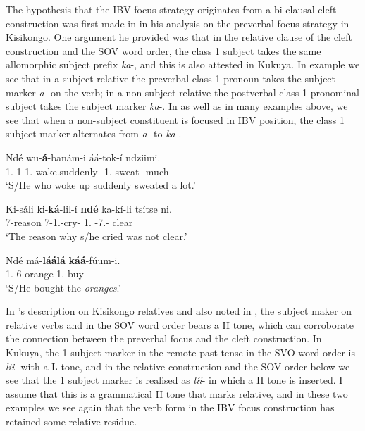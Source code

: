 \documentclass[output=paper,colorlinks,citecolor=brown,
]{langscibook}
\begin{document}
The hypothesis that the IBV focus strategy originates from a bi-clausal cleft construction was first made in \citet{DeKind2014} in his analysis on the preverbal focus strategy in Kisikongo. One argument he  provided was that in the relative clause of the cleft construction and the SOV word order, the class 1 subject takes the same allomorphic subject prefix \textit{ka}-, and this is also attested in Kukuya. In example  we see that in a subject relative the preverbal class 1 pronoun takes the subject marker \textit{a}- on the verb; in a non-subject relative the postverbal class 1 pronominal subject takes the subject marker \textit{ka}-. In  as well as in many examples above, we see that when a non-subject constituent is focused in IBV position, the class 1 subject marker alternates from \textit{a}- to \textit{ka}-.
\begin{exe}
    \ex \label{145}
    \begin{xlist}
\ex
\label{145a}
\gll
Ndé wu-\textbf{á}-banám-i áá-tok-í ndziimi.\\
1.\Pro{} 1\Rel{}-1\Sm{}.\Pst{}-wake.suddenly-\Pst{} 1\Sm{}.\Pst{}-sweat-\Pst{} much\\
\trans ‘S/He who woke up suddenly sweated a lot.’ \\

\ex
\label{145b}
\gll
Ki-sáli ki-\textbf{ká}-lil-í \textbf{ndé} ka-kí-li tsítse ni.\\
7-reason 7\Rel{}-1\Sm{}.\Pst{}-cry-\Pst{} 1.\Pro{} \Neg{}-7\Sm{}.\Pst{}-\Cop{} clear \Neg{}\\
\trans ‘The reason why s/he cried was not clear.’ 

    \end{xlist}
\end{exe}
\begin{exe}
\ex
\label{146}
\gll
Ndé má-\textbf{láálá} \textbf{káá}-fúum-i.\\
1.\Pro{} 6-orange 1\Sm{}.\Pst{}-buy-\Pst{}\\
\trans ‘S/He bought the \textit{oranges}.’

\end{exe}
In \citet{NdongaMfuwa1995}'s description on Kisikongo relatives and also noted in \citet{DeKind2014}, the subject maker on relative verbs and in the SOV word order bears a H tone, which can corroborate the connection between the preverbal focus and the cleft construction. In Kukuya, the 1\Pl{} subject marker in the remote past tense in the SVO word order is \textit{lii}- with a L tone, and in the relative construction  and the SOV order  below we see that the 1\Pl{} subject marker is realised as \textit{líi}- in which a H tone is inserted. I assume that this is a grammatical H tone that marks relative, and in these two examples we see again that the verb form in the IBV focus construction has retained some relative residue.
\end{document}

